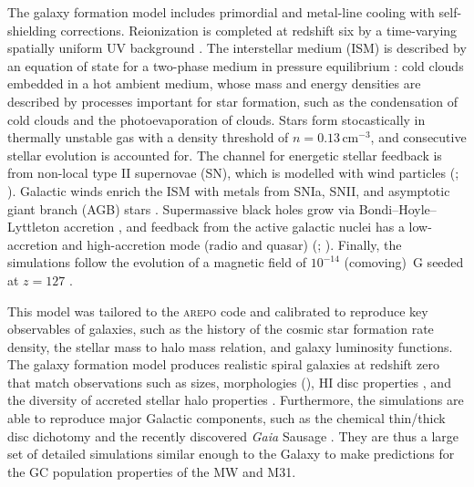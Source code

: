 \documentclass[a4paper,fleqn,usenatbib]{mnras}
\begin{document}
The galaxy formation model includes primordial and metal-line cooling with 
self-shielding corrections. Reionization is completed at redshift six by a
time-varying spatially uniform UV background \citep{2009ApJ...703.1416F, 
2013MNRAS.436.3031V}. The interstellar medium (ISM) is described by an equation of 
state for a two-phase medium in pressure equilibrium \citep{2003MNRAS.339..289S}: 
cold clouds embedded in a hot ambient medium, whose mass and energy densities
are described by processes important for star formation, such as the condensation 
of cold clouds and the photoevaporation of clouds. Stars form stocastically in 
thermally unstable gas with a density threshold of $n = 0.13 \, \text{cm}^{-3}$,
and consecutive stellar evolution is accounted for. The channel for energetic
stellar feedback is from non-local type II supernovae (SN), which is modelled 
with wind particles (\citealt{2014MNRAS.437.1750M}; ).
Galactic winds enrich the ISM with metals from SNIa, SNII, and asymptotic giant 
branch (AGB) stars \citep{2013MNRAS.436.3031V}. Supermassive
black holes grow via Bondi–Hoyle–Lyttleton accretion \citep{1944MNRAS.104..273B,
1952MNRAS.112..195B}, and feedback from the active galactic nuclei has a low-accretion
and high-accretion mode (radio and quasar) (\citealt{2005MNRAS.361..776S, 
2014MNRAS.437.1750M}; ). Finally, the simulations 
follow the evolution of a magnetic field of $10^{-14}$ (comoving)~G seeded at 
$z = 127$ \citep{2013MNRAS.432..176P, 2014ApJ...783L..20P}.

This model was tailored to the \textsc{arepo} code and calibrated to reproduce
key observables of galaxies, such as the history of the cosmic star formation rate
density, the stellar mass to halo mass relation, and galaxy luminosity functions.
The galaxy formation model produces realistic spiral galaxies at redshift zero
that match observations such as sizes, morphologies (),
HI disc properties \citep{2017MNRAS.466.3859M}, and the diversity of accreted stellar
halo properties \citep{2019MNRAS.485.2589M}. Furthermore, the simulations are able to
reproduce major Galactic components, such as the chemical thin/thick disc dichotomy
\citep{2018MNRAS.474.3629G} and the recently discovered \textit{Gaia} Sausage 
\citep{2019MNRAS.484.4471F}. They are thus a large set of detailed simulations
similar enough to the Galaxy to make predictions for the GC population properties
of the MW and M31.
\end{document}

